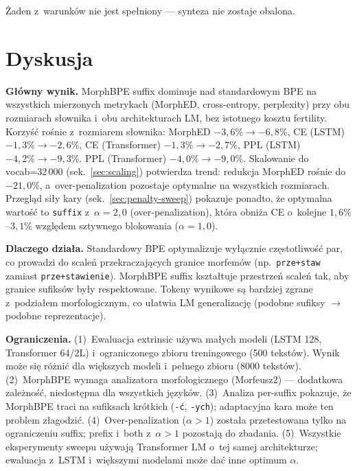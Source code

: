 Żaden z~warunków nie jest spełniony --- synteza nie zostaje obalona.

\section{Dyskusja}

\textbf{Główny wynik.} MorphBPE suffix dominuje nad standardowym BPE
na wszystkich mierzonych metrykach (MorphED, cross-entropy, perplexity)
przy obu rozmiarach słownika i~obu architekturach LM, bez istotnego
kosztu fertility. Korzyść rośnie z~rozmiarem słownika:
MorphED $-3{,}6\% \to -6{,}8\%$,
CE (LSTM) $-1{,}3\% \to -2{,}6\%$,
CE (Transformer) $-1{,}3\% \to -2{,}7\%$,
PPL (LSTM) $-4{,}2\% \to -9{,}3\%$.
PPL (Transformer) $-4{,}0\% \to -9{,}0\%$.
Skalowanie do vocab=32\,000 (sek.~\ref{sec:scaling}) potwierdza
trend: redukcja MorphED rośnie do $-21{,}0\%$, a~over-penalization
pozostaje optymalne na wszystkich rozmiarach.
Przegląd siły kary (sek.~\ref{sec:penalty-sweep}) pokazuje ponadto,
że optymalna wartość to \texttt{suffix} z~$\alpha = 2{,}0$
(over-penalization), która obniża CE o~kolejne $1{,}6\%$--$3{,}1\%$
względem sztywnego blokowania ($\alpha = 1{,}0$).

\textbf{Dlaczego działa.} Standardowy BPE optymalizuje wyłącznie
częstotliwość par, co prowadzi do scaleń przekraczających granice
morfemów (np.\ \texttt{prze+staw} zamiast \texttt{prze+stawienie}).
MorphBPE suffix kształtuje przestrzeń scaleń tak, aby granice
sufiksów były respektowane. Tokeny wynikowe są bardziej zgrane
z~podziałem morfologicznym, co ułatwia LM generalizację
(podobne sufiksy $\to$ podobne reprezentacje).

\textbf{Ograniczenia.}
(1)~Ewaluacja extrinsic używa małych modeli (LSTM 128, Transformer 64/2L)
i~ograniczonego zbioru treningowego (500 tekstów). Wynik może się różnić
dla większych modeli i~pełnego zbioru (8000 tekstów).
(2)~MorphBPE wymaga analizatora morfologicznego (Morfeusz2) ---
dodatkowa zależność, niedostępna dla wszystkich języków.
(3)~Analiza per-suffix pokazuje, że MorphBPE traci na sufiksach krótkich
(\texttt{-ć}, \texttt{-ych}); adaptacyjna kara może ten problem złagodzić.
(4)~Over-penalization ($\alpha > 1$) została przetestowana tylko
na ograniczeniu suffix; prefix i~both z~$\alpha > 1$ pozostają do zbadania.
(5)~Wszystkie eksperymenty sweepu używają Transformer LM o~tej samej
architekturze; ewaluacja z~LSTM i~większymi modelami może dać inne optimum $\alpha$.

